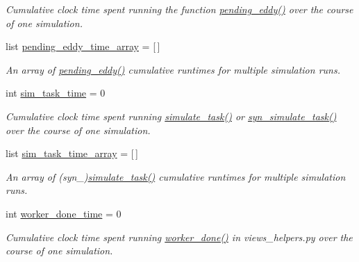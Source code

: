 \begin{DoxyCompactItemize}
\begin{DoxyCompactList}\small\item\em Cumulative clock time spent running the function \mbox{\hyperlink{namespacedynamicfilterapp_1_1views__helpers_ad11bcb9737901ab723493b4f7fe09329}{pending\+\_\+eddy()}} over the course of one simulation. \end{DoxyCompactList}\item 
list \mbox{\hyperlink{classdynamicfilterapp_1_1test__simulations_1_1_simulation_test_a52b2537908d48417dca35915eadfad89}{pending\+\_\+eddy\+\_\+time\+\_\+array}} = \mbox{[}$\,$\mbox{]}
\begin{DoxyCompactList}\small\item\em An array of \mbox{\hyperlink{namespacedynamicfilterapp_1_1views__helpers_ad11bcb9737901ab723493b4f7fe09329}{pending\+\_\+eddy()}} cumulative runtimes for multiple simulation runs. \end{DoxyCompactList}\item 
int \mbox{\hyperlink{classdynamicfilterapp_1_1test__simulations_1_1_simulation_test_ab7d456049efdc5d9da3fd20938f5aa1c}{sim\+\_\+task\+\_\+time}} = 0
\begin{DoxyCompactList}\small\item\em Cumulative clock time spent running \mbox{\hyperlink{classdynamicfilterapp_1_1test__simulations_1_1_simulation_test_a8bed8f0f57234f8356ce3bc19606c6bf}{simulate\+\_\+task()}} or \mbox{\hyperlink{classdynamicfilterapp_1_1test__simulations_1_1_simulation_test_adb57a1130669e13cca7754f0a6ea040f}{syn\+\_\+simulate\+\_\+task()}} over the course of one simulation. \end{DoxyCompactList}\item 
list \mbox{\hyperlink{classdynamicfilterapp_1_1test__simulations_1_1_simulation_test_a0cb38299204269a784337186882a99e3}{sim\+\_\+task\+\_\+time\+\_\+array}} = \mbox{[}$\,$\mbox{]}
\begin{DoxyCompactList}\small\item\em An array of (syn\+\_\+)\mbox{\hyperlink{classdynamicfilterapp_1_1test__simulations_1_1_simulation_test_a8bed8f0f57234f8356ce3bc19606c6bf}{simulate\+\_\+task()}} cumulative runtimes for multiple simulation runs. \end{DoxyCompactList}\item 
int \mbox{\hyperlink{classdynamicfilterapp_1_1test__simulations_1_1_simulation_test_ab6da582941b08e9341e17555b8862fbd}{worker\+\_\+done\+\_\+time}} = 0
\begin{DoxyCompactList}\small\item\em Cumulative clock time spent running \mbox{\hyperlink{namespacedynamicfilterapp_1_1views__helpers_af27860dfe5bfa6b2b8a1b29347eb918d}{worker\+\_\+done()}} in views\+\_\+helpers.\+py over the course of one simulation. \end{DoxyCompactList}\item 

\end{DoxyCompactItemize}
